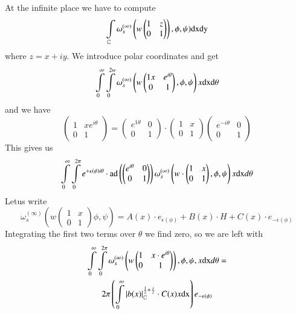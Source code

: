 At the infinite place we have to compute
$$
\int\limits_{\mathbb{C}}\omega_{s}^{(\infty)}\left(w\left(\begin{matrix} 1 & z\\ 0 & 1\end{matrix}\right)\right),\phi,\psi)\mathrm{dx} \mathrm{dy}
$$
where $z=x+iy$. We introduce polar coordinates and get
$$
\int\limits^{\infty}_{0}\int\limits^{2w}_{0}\omega_{s}^{(\infty)}\left(w\left(\begin{matrix} 1x & e^{i\theta}\\ 0 & 1\end{matrix}\right),\phi,\psi\right)x\mathrm{dx} \text{d}\theta
$$
and we have
$$
\left(
\begin{matrix}
1 & xe^{i\theta}\\ 0 & 1
\end{matrix}
\right)
=
\left(
\begin{matrix}
e^{1\theta} & 0\\
0 & 1
\end{matrix}
\right)
\cdot
\left(
\begin{matrix}
1 & x\\ 0 & 1
\end{matrix}
\right)
\left(
\begin{matrix}
e^{-i\theta} & 0\\
0 & 1
\end{matrix}
\right)
$$
This gives us
$$
\int\limits^{\infty}_{0}\int\limits^{2\pi}_{0}e^{+\epsilon(\phi)i\theta}\cdot \operatorname{ad}
\left(\left(
\begin{matrix}
e^{i\theta} & 0\\
0 & 1
\end{matrix}
\right)\right)
\omega_{s}^{(\infty)}\left(w\cdot
\left(
\begin{matrix}
1 & x\\ 0 & 1
\end{matrix}
\right),\phi,\psi\right)
x\mathrm{dx} d\theta
$$
Let\pageoriginale us write
$$
\omega^{(\infty)}_{s}\left(w
\left(
\begin{matrix}
1 & x\\ 0 & 1
\end{matrix}
\right)\phi,\psi\right)=A(x)\cdot e_{\epsilon(\phi)}+B(x)\cdot H+C(x)\cdot e_{-\epsilon(\phi)}
$$
Integrating the first two terms over $\theta$ we find zero, so we are left with
\begin{gather*}
\int\limits^{\infty}_{0}\int\limits^{2\pi}_{0}\omega^{(\infty)}_{s}\left(w
\left(
\begin{matrix}
1 & x\cdot e^{i\theta}\\ 0 & 1
\end{matrix}
\right)\right),\phi,\psi,x\mathrm{dx} d\theta=\\
2\pi\left(\int\limits^{\infty}_{0}|b(x)|^{\frac{1}{2}+\frac{s}{2}}_{\mathbb{C}}\cdot C(x)x\mathrm{dx}\right)e_{-\epsilon(\phi)}
\end{gather*}
